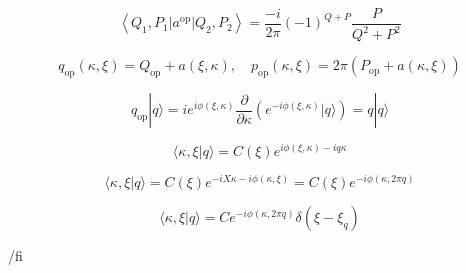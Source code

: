 \documentclass[main.tex]{subfiles}
\begin{document}
\begin{equation}\label{16.49}
	\left\langle Q_{1}, P_{1}\left|a^{\mathrm{op}}\right| Q_{2}, P_{2}\right\rangle=\frac{-i}{2 \pi}(-1)^{Q+P} \frac{P}{Q^{2}+P^{2}}
\end{equation}



\begin{equation}\label{16.50}
	q_{\mathrm{op}}(\kappa, \xi)=Q_{\mathrm{op}}+a(\xi, \kappa), \quad p_{\mathrm{op}}(\kappa, \xi)=2 \pi\left(P_{\mathrm{op}}+a(\kappa, \xi)\right)
\end{equation}



\begin{equation}\label{16.51}
	q_{\mathrm{op}}|q\rangle= i e^{i \phi(\xi, \kappa)} \frac{\partial}{\partial \kappa}\left(e^{-i \phi(\xi, \kappa)}|q\rangle\right)=q|q\rangle
\end{equation}


\begin{equation}\label{16.52}
	\langle\kappa, \xi | q\rangle= C(\xi) e^{i \phi(\xi, \kappa)-i q \kappa}
\end{equation}



\begin{equation}\label{16.53}
	\langle\kappa, \xi | q\rangle= C(\xi) e^{-i X \kappa-i \phi(\kappa, \xi)}=C(\xi) e^{-i \phi(\kappa, 2 \pi q)}
\end{equation}



\begin{equation}\label{16.54}
	\langle\kappa, \xi | q\rangle= C e^{-i \phi(\kappa, 2 \pi q)} \delta\left(\xi-\xi_{q}\right)
\end{equation}


/fi
\end{document}
